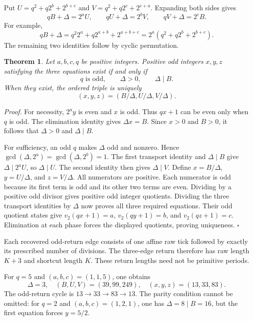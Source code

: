 \documentclass[11pt,letterpaper]{article}
\newtheorem{theorem}{Theorem}
\newenvironment{proof}{\noindent\textit{Proof.}}{\hfill\(\square\)}
\begin{document}
Put \(U=q^2+q2^b+2^{b+c}\) and \(V=q^2+q2^c+2^{c+a}\).
Expanding both sides gives
\[
qB+\Delta=2^aU,\qquad
qU+\Delta=2^bV,\qquad
qV+\Delta=2^cB.
\]
For example,
\[
qB+\Delta=q^2 2^a+q2^{a+b}+2^{a+b+c}
=2^a(q^2+q2^b+2^{b+c}).
\]
The remaining two identities follow by cyclic permutation.

\begin{theorem}
Let \(a,b,c,q\) be positive integers. Positive odd integers \(x,y,z\)
satisfying the three equations exist if and only if
\[
q\text{ is odd},\qquad \Delta>0,\qquad \Delta\mid B.
\]
When they exist, the ordered triple is uniquely
\[
(x,y,z)=(B/\Delta,U/\Delta,V/\Delta).
\]
\end{theorem}

\begin{proof}
For necessity, \(2^a y\) is even and \(x\) is odd. Thus \(qx+1\)
can be even only when \(q\) is odd. The elimination identity gives
\(\Delta x=B\). Since \(x>0\) and \(B>0\), it follows that
\(\Delta>0\) and \(\Delta\mid B\).

For sufficiency, an odd \(q\) makes \(\Delta\) odd and nonzero.
Hence \(\gcd(\Delta,2^a)=\gcd(\Delta,2^b)=1\).
The first transport identity and \(\Delta\mid B\) give
\(\Delta\mid 2^aU\), so \(\Delta\mid U\).
The second identity then gives \(\Delta\mid V\).
Define \(x=B/\Delta\), \(y=U/\Delta\), and \(z=V/\Delta\).
All numerators are positive. Each numerator is odd because its first
term is odd and its other two terms are even. Dividing by a positive odd
divisor gives positive odd integer quotients.
Dividing the three transport identities by \(\Delta\) now proves all
three required equations. Their odd quotient states give
\(v_2(qx+1)=a\), \(v_2(qy+1)=b\), and \(v_2(qz+1)=c\).
Elimination at each phase forces the displayed quotients, proving uniqueness.
\end{proof}

Each recovered odd-return edge consists of one affine raw tick followed
by exactly its prescribed number of divisions. The three-edge return
therefore has raw length \(K+3\) and shortcut length \(K\).
These return lengths need not be primitive periods.

For \(q=5\) and \((a,b,c)=(1,1,5)\), one obtains
\[
\Delta=3,\quad (B,U,V)=(39,99,249),\quad (x,y,z)=(13,33,83).
\]
The odd-return cycle is \(13\to33\to83\to13\).
The parity condition cannot be omitted: for \(q=2\) and
\((a,b,c)=(1,2,1)\), one has \(\Delta=8\mid B=16\), but the first
equation forces \(y=5/2\).
\end{document}

